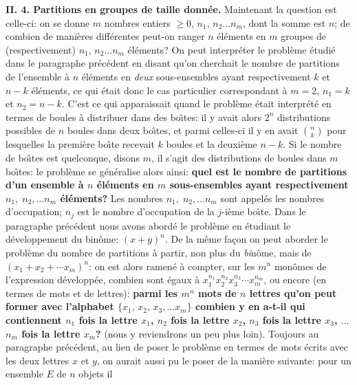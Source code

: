 \bigskip 
 
{\bf II. 4.  Partitions en groupes de taille donn\'ee.} 
\medskip 
Maintenant la question est celle-ci: 
on se donne $m$ nombres entiers $\geq 0$, $n_1$, $n_2 \ldots n_m$, 
dont la somme est $n$; de combien de mani\`eres diff\'erentes peut-on  
ranger $n$ \'el\'ements en $m$ groupes de (respectivement) $n_1$, $n_2 
\ldots n_m$ \'el\'ements?  
\medskip 
On peut interpr\'eter le probl\`eme \'etudi\'e dans le paragraphe  
pr\'ec\'edent en disant qu'on cherchait le nombre de partitions de  
l'ensemble \`a $n$ \'el\'ements  en {\it deux} sous-ensembles ayant 
respectivement $k$ et $n-k$ \'el\'ements, ce qui \'etait donc le cas 
particulier correspondant \`a $m=2$, $n_1=k$ et $n_2=n-k$. C'est ce qui 
apparaissait quand le probl\`eme \'etait interpr\'et\'e en termes de boules 
\`a distribuer  dans des bo\^\i tes: il y avait alors $2^n$ distributions 
possibles de $n$ boules dans deux bo\^\i tes, et parmi celles-ci il y en  
avait ${n \choose k}$ pour lesquelles la premi\`ere bo\^\i te recevait $k$ 
boules et la deuxi\`eme $n-k$. Si le nombre de bo\^\i tes est quelconque,  
disons $m$, il s'agit des distributions de boules dans $m$ bo\^\i tes: le 
probl\`eme se g\'en\'eralise alors ainsi: {\bf quel est le nombre de 
partitions d'un ensemble \`a $n$ \'el\'ements en $m$ sous-ensembles  
ayant respectivement $n_1, \; n_2, \ldots  n_m$ \'el\'ements?} Les  
nombres $n_1, \; n_2, \ldots  n_m$ sont appel\'es les nombres  
d'occupation; $n_j$ est le nombre d'occupation de  la $j$-i\`eme bo\^\i te. 
\medskip 
Dans le paragraphe pr\'ec\'edent nous avons abord\'e le probl\`eme en  
\'etudiant le d\'eveloppement du bin\^ome: $(x+y)^n$. De la m\^eme fa\c 
con on peut aborder le probl\`eme du nombre de partitions \`a partir, non 
plus du {\it bi}n\^ome, mais de $(x_1 + x_2 + \cdots x_m)^n$: on est alors 
ramen\'e \`a compter, sur les $m^n$ mon\^omes de l'expression 
d\'evelopp\'ee, combien sont \'egaux \`a $x_1^{n_1} x_2^{n_2} x_3^{n_3} 
\cdots x_m^{n_m}$, ou encore (en termes de mots et de lettres): {\bf  
parmi les $m^n$ mots de $n$ lettres qu'on peut former avec l'alphabet  
$\{ x_1, \, x_2, \,  x_3, \ldots  x_m \}$  combien y en a-t-il qui 
contiennent $n_1$ fois la lettre $x_1$,  $n_2$ fois la lettre $x_2$,   
$n_3$ fois la lettre $x_3$, $\ldots$  $n_m$ fois la lettre $x_m$?}  
(nous y reviendrons un peu plus loin). 
\medskip 
Toujours au paragraphe pr\'ec\'edent, au lieu de poser le probl\`eme en  
termes de mots \'ecrits avec les deux lettres $x$ et $y$, on aurait aussi  
pu le poser de la mani\`ere suivante: pour un ensemble $E$ de $n$ objets il  
